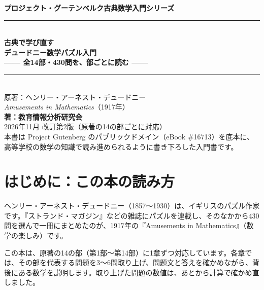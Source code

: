 \documentclass[a4paper,11pt,openany]{ltjsbook}
\begin{document}
\begin{titlepage}
\begin{center}
\vspace*{1.5cm}
{\Large\bfseries プロジェクト・グーテンベルク古典数学入門シリーズ}\\[0.8cm]
\rule{\textwidth}{1.5pt}\\[0.4cm]
{\Huge\bfseries 古典で学び直す\\デュードニー数学パズル入門}\\[0.4cm]
{\Large\bfseries —— 全14部・430問を、部ごとに読む ——}\\[0.4cm]
\rule{\textwidth}{1.5pt}\\[1.5cm]
{\large 原著：ヘンリー・アーネスト・デュードニー\\
\textit{Amusements in Mathematics}（1917年）}\\[2.0cm]
{\Large\bfseries 著：教育情報分析研究会}\\[2.5cm]
\vfill
{\large 2026年11月 改訂第2版（原著の14の部ごとに対応）}\\[0.5cm]
{\footnotesize 本書は Project Gutenberg のパブリックドメイン（eBook \#16713）を底本に、\\
高等学校の数学の知識で読み進められるように書き下ろした入門書です。}
\end{center}
\end{titlepage}

\frontmatter
\tableofcontents
\mainmatter

\chapter*{はじめに：この本の読み方}

ヘンリー・アーネスト・デュードニー（1857〜1930）は、イギリスのパズル作家です。『ストランド・マガジン』などの雑誌にパズルを連載し、そのなかから430問を選んで一冊にまとめたのが、1917年の『Amusements in Mathematics』（数学の楽しみ）です。

この本は、原著の14の部（第1部〜第14部）に1章ずつ対応しています。各章では、その部を代表する問題を3〜6問取り上げ、問題文と答えを確かめながら、背後にある数学を説明します。取り上げた問題の数値は、あとから計算で確かめ直しました。
\end{document}
